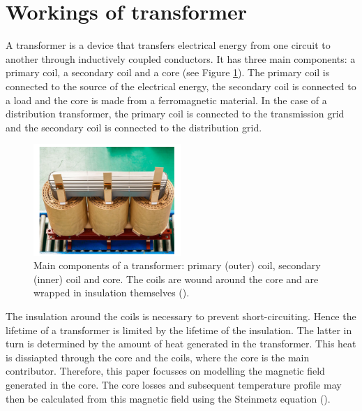 \section{Workings of transformer}
A transformer is a device that transfers electrical energy from one circuit to another through inductively coupled conductors. 
It has three main components: a primary coil, a secondary coil and a core (see Figure \ref{fig:transformercore}). 
The primary coil is connected to the source of the electrical energy, the secondary coil is connected to a load and the core is made from a ferromagnetic material.
In the case of a distribution transformer, the primary coil is connected to the transmission grid and the secondary coil is connected to the distribution grid.
\begin{figure}[H]
    \centering
    \includegraphics[width=0.5\textwidth]{img/transformercore.png}
    \caption{Main components of a transformer: primary (outer) coil, secondary (inner) coil and core. The coils are wound around the core
    and are wrapped in insulation themselves (\cite{sSatsangi}).}
    \label{fig:transformercore}
\end{figure}

The insulation around the coils is necessary to prevent short-circuiting. Hence the lifetime of a transformer is limited by the lifetime of the insulation.
The latter in turn is determined by the amount of heat generated in the transformer. This heat is dissiapted through the core and the coils, where the core is the main contributor.
Therefore, this paper focusses on modelling the magnetic field generated in the core. 
The core losses and subsequent temperature profile may then be calculated from this magnetic field using the Steinmetz equation (\cite{steinmetzEq,vanDijk2022}).

